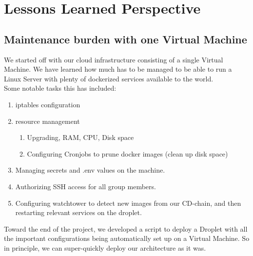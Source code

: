\section{Lessons Learned Perspective}

\subsection{Maintenance burden with one Virtual Machine}
We started off with our cloud infrastructure consisting of a single Virtual Machine. We have learned how much has to be managed to be able to run a Linux Server with plenty of dockerized services available to the world. \\
Some notable tasks this has included:
\begin{enumerate}
    \item iptables configuration
    \item resource management 
    \begin{enumerate}
        \item Upgrading, RAM, CPU, Disk space
        \item Configuring Cronjobs to prune docker images (clean up disk space)
    \end{enumerate}
    \item Managing secrets and .env values on the machine. 
    \item Authorizing SSH access for all group members.
    \item Configuring watchtower to detect new images from our CD-chain, and then restarting relevant services on the droplet.
\end{enumerate}
Toward the end of the project, we developed a script to deploy a Droplet with all the important configurations being automatically set up on a Virtual Machine. So in principle, we can super-quickly deploy our architecture as it was.

